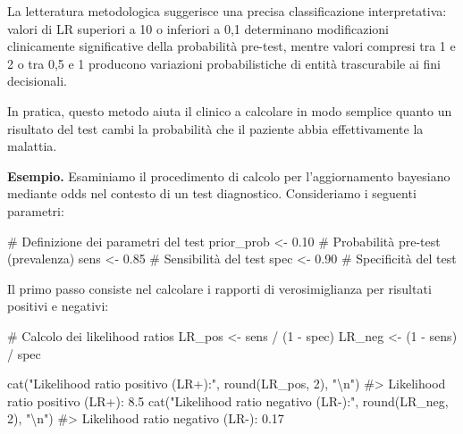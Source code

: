 \documentclass[
  letterpaper,
  DIV=11,
  numbers=noendperiod,
  oneside]{scrreprt}
\newenvironment{Shaded}{\begin{snugshade}}{\end{snugshade}}
\newcommand{\CommentTok}[1]{\textcolor[rgb]{0.37,0.37,0.37}{#1}}
\newcommand{\DecValTok}[1]{\textcolor[rgb]{0.68,0.00,0.00}{#1}}
\newcommand{\FloatTok}[1]{\textcolor[rgb]{0.68,0.00,0.00}{#1}}
\newcommand{\FunctionTok}[1]{\textcolor[rgb]{0.28,0.35,0.67}{#1}}
\newcommand{\NormalTok}[1]{\textcolor[rgb]{0.00,0.23,0.31}{#1}}
\newcommand{\OtherTok}[1]{\textcolor[rgb]{0.00,0.23,0.31}{#1}}
\newcommand{\SpecialCharTok}[1]{\textcolor[rgb]{0.37,0.37,0.37}{#1}}
\newcommand{\StringTok}[1]{\textcolor[rgb]{0.13,0.47,0.30}{#1}}
\theoremstyle{definition}
\theoremstyle{plain}
\theoremstyle{definition}
\theoremstyle{remark}
\begin{document}
La letteratura metodologica suggerisce una precisa classificazione
interpretativa: valori di LR superiori a 10 o inferiori a 0,1
determinano modificazioni clinicamente significative della probabilità
pre-test, mentre valori compresi tra 1 e 2 o tra 0,5 e 1 producono
variazioni probabilistiche di entità trascurabile ai fini decisionali.

In pratica, questo metodo aiuta il clinico a calcolare in modo semplice
quanto un risultato del test cambi la probabilità che il paziente abbia
effettivamente la malattia.

\textbf{Esempio.} Esaminiamo il procedimento di calcolo per
l'aggiornamento bayesiano mediante odds nel contesto di un test
diagnostico. Consideriamo i seguenti parametri:

\begin{Shaded}
\begin{Highlighting}[]
\CommentTok{\# Definizione dei parametri del test}
\NormalTok{prior\_prob }\OtherTok{\textless{}{-}} \FloatTok{0.10}  \CommentTok{\# Probabilità pre{-}test (prevalenza)}
\NormalTok{sens }\OtherTok{\textless{}{-}} \FloatTok{0.85}        \CommentTok{\# Sensibilità del test}
\NormalTok{spec }\OtherTok{\textless{}{-}} \FloatTok{0.90}        \CommentTok{\# Specificità del test}
\end{Highlighting}
\end{Shaded}

Il primo passo consiste nel calcolare i rapporti di verosimiglianza per
risultati positivi e negativi:

\begin{Shaded}
\begin{Highlighting}[]
\CommentTok{\# Calcolo dei likelihood ratios}
\NormalTok{LR\_pos }\OtherTok{\textless{}{-}}\NormalTok{ sens }\SpecialCharTok{/}\NormalTok{ (}\DecValTok{1} \SpecialCharTok{{-}}\NormalTok{ spec)}
\NormalTok{LR\_neg }\OtherTok{\textless{}{-}}\NormalTok{ (}\DecValTok{1} \SpecialCharTok{{-}}\NormalTok{ sens) }\SpecialCharTok{/}\NormalTok{ spec}

\FunctionTok{cat}\NormalTok{(}\StringTok{"Likelihood ratio positivo (LR+):"}\NormalTok{, }\FunctionTok{round}\NormalTok{(LR\_pos, }\DecValTok{2}\NormalTok{), }\StringTok{"}\SpecialCharTok{\textbackslash{}n}\StringTok{"}\NormalTok{)}
\CommentTok{\#\textgreater{} Likelihood ratio positivo (LR+): 8.5}
\FunctionTok{cat}\NormalTok{(}\StringTok{"Likelihood ratio negativo (LR{-}):"}\NormalTok{, }\FunctionTok{round}\NormalTok{(LR\_neg, }\DecValTok{2}\NormalTok{), }\StringTok{"}\SpecialCharTok{\textbackslash{}n}\StringTok{"}\NormalTok{)}
\CommentTok{\#\textgreater{} Likelihood ratio negativo (LR{-}): 0.17}
\end{Highlighting}
\end{Shaded}
\end{document}
